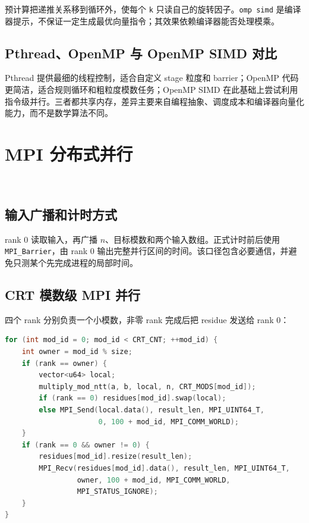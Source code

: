 预计算把递推关系移到循环外，使每个 \texttt{k} 只读自己的旋转因子。\texttt{omp simd} 是编译器提示，不保证一定生成最优向量指令；其效果依赖编译器能否处理模乘。

\subsection{Pthread、OpenMP 与 OpenMP SIMD 对比}

Pthread 提供最细的线程控制，适合自定义 stage 粒度和 barrier；OpenMP 代码更简洁，适合规则循环和粗粒度模数任务；OpenMP SIMD 在此基础上尝试利用指令级并行。三者都共享内存，差异主要来自编程抽象、调度成本和编译器向量化能力，而不是数学算法不同。

\section{MPI 分布式并行}\oldwork\ \fusionwork

\subsection{输入广播和计时方式}

rank 0 读取输入，再广播 $n$、目标模数和两个输入数组。正式计时前后使用 \texttt{MPI\_Barrier}，由 rank 0 输出完整并行区间的时间。该口径包含必要通信，并避免只测某个先完成进程的局部时间。

\subsection{CRT 模数级 MPI 并行}

四个 rank 分别负责一个小模数，非零 rank 完成后把 residue 发送给 rank 0：

\begin{lstlisting}[title=CRT模数级MPI并行,label={lst:mpi-mod},language={C++}]
for (int mod_id = 0; mod_id < CRT_CNT; ++mod_id) {
    int owner = mod_id % size;
    if (rank == owner) {
        vector<u64> local;
        multiply_mod_ntt(a, b, local, n, CRT_MODS[mod_id]);
        if (rank == 0) residues[mod_id].swap(local);
        else MPI_Send(local.data(), result_len, MPI_UINT64_T,
                      0, 100 + mod_id, MPI_COMM_WORLD);
    }
    if (rank == 0 && owner != 0) {
        residues[mod_id].resize(result_len);
        MPI_Recv(residues[mod_id].data(), result_len, MPI_UINT64_T,
                 owner, 100 + mod_id, MPI_COMM_WORLD,
                 MPI_STATUS_IGNORE);
    }
}
\end{lstlisting}

